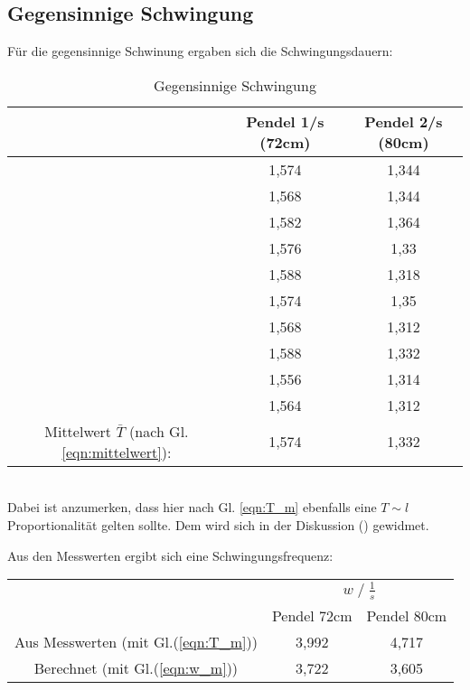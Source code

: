 \subsection{Gegensinnige Schwingung}
Für die gegensinnige Schwinung ergaben sich die Schwingungsdauern:
\begin{table}
    \centering
    \label{tab:Data_gegenphasig}
    \begin{tabular}{c c | c}
        \toprule
        & Pendel 1\;/\;s (72cm) & Pendel 2\;/\;s (80cm)\\
        \midrule
        & 1,574 & 1,344 \\
        & 1,568 & 1,344 \\
        & 1,582 & 1,364 \\
        & 1,576 & 1,33  \\
        & 1,588 & 1,318 \\
        & 1,574 & 1,35  \\
        & 1,568 & 1,312 \\
        & 1,588 & 1,332 \\
        & 1,556 & 1,314 \\
        & 1,564 & 1,312 \\
        \midrule
        Mittelwert $\bar{T}$ (nach Gl. \ref{eqn:mittelwert}): & 1,574 & 1,332 \\
        \bottomrule
    \end{tabular}
    \caption{Gegensinnige Schwingung}
\end{table}
\\Dabei ist anzumerken, dass hier nach Gl. \ref{eqn:T_m} ebenfalls eine $T \sim l$ Proportionalität
gelten sollte. Dem wird sich in der Diskussion () gewidmet.\newline

Aus den Messwerten ergibt sich eine Schwingungsfrequenz:
\begin{table}
    \centering
    \label{tab:frq_gegens}
    \begin{tabular}{c c c}
        \toprule
        & \multicolumn{2}{c}{$w\;/\;\frac{1}{s}$}\\
        \cmidrule(lr){2-3} 
        & Pendel 72cm & Pendel 80cm\\
        \midrule
        Aus Messwerten (mit Gl.(\ref{eqn:T_m})) & 3,992 & 4,717 \\
        Berechnet (mit Gl.(\ref{eqn:w_m}))      & 3,722 & 3,605 \\
        \bottomrule
    \end{tabular}
\end{table}
\newpage
